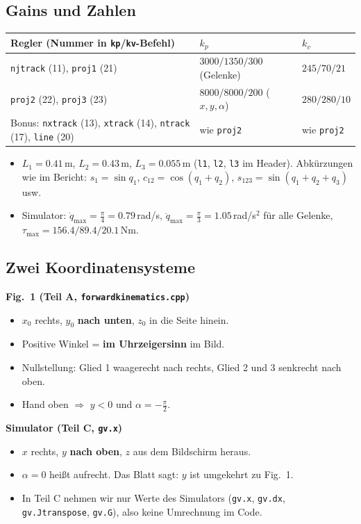 \documentclass[10pt,a4paper]{article}
\newcommand{\code}[1]{\texttt{#1}}
\begin{document}
\subsection{Gains und Zahlen}
{\small
\begin{tabular}{@{}lll@{}}
  \toprule
  Regler (Nummer in \code{kp}/\code{kv}-Befehl) & $k_p$ & $k_v$ \\
  \midrule
  \code{njtrack} (11), \code{proj1} (21) & $3000 / 1350 / 300$ (Gelenke) & $245 / 70 / 21$ \\
  \code{proj2} (22), \code{proj3} (23) & $8000 / 8000 / 200$ ($x, y, \alpha$) & $280 / 280 / 10$ \\
  Bonus: \code{nxtrack} (13), \code{xtrack} (14), \code{ntrack} (17), \code{line} (20) & wie \code{proj2} & wie \code{proj2} \\
  \bottomrule
\end{tabular}
}

\begin{itemize}
  \item $L_1 = 0.41$\,m, $L_2 = 0.43$\,m, $L_3 = 0.055$\,m (\code{l1}, \code{l2}, \code{l3} im Header). Abkürzungen wie im
        Bericht: $s_1 = \sin q_1$, $c_{12} = \cos(q_1 + q_2)$, $s_{123} = \sin(q_1 + q_2 + q_3)$ usw.
  \item Simulator: $\dot q_{\max} = \frac{\pi}{4} = 0.79$\,rad/s, $\ddot q_{\max} = \frac{\pi}{3} = 1.05$\,rad/s$^2$ für alle Gelenke,
        $\tau_{\max} = 156.4 / 89.4 / 20.1$\,Nm.
\end{itemize}

\subsection{Zwei Koordinatensysteme}
\begin{minipage}[t]{0.49\textwidth}
\textbf{Fig.~1 (Teil A, \code{forwardkinematics.cpp})}
\begin{itemize}
  \item $x_0$ rechts, $y_0$ \textbf{nach unten}, $z_0$ in die Seite hinein.
  \item Positive Winkel = \textbf{im Uhrzeigersinn} im Bild.
  \item Nullstellung: Glied 1 waagerecht nach rechts, Glied 2 und 3 senkrecht nach oben.
  \item Hand oben $\Rightarrow$ $y < 0$ und $\alpha = -\frac{\pi}{2}$.
\end{itemize}
\end{minipage}\hfill
\begin{minipage}[t]{0.49\textwidth}
\textbf{Simulator (Teil C, \code{gv.x})}
\begin{itemize}
  \item $x$ rechts, $y$ \textbf{nach oben}, $z$ aus dem Bildschirm heraus.
  \item $\alpha = 0$ heißt aufrecht. Das Blatt sagt: $y$ ist umgekehrt zu Fig.~1.
  \item In Teil C nehmen wir nur Werte des Simulators (\code{gv.x}, \code{gv.dx}, \code{gv.Jtranspose}, \code{gv.G}),
        also keine Umrechnung im Code.
\end{itemize}
\end{minipage}
\end{document}
